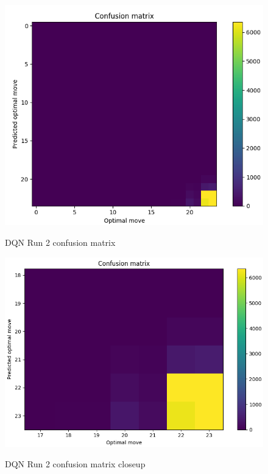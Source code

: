\begin{figure}
\caption{DQN Run 2 confusion matrix}
\centering
\includegraphics[scale=0.5]{cm3.png}\\
\end{figure}

\begin{figure}
\caption{DQN Run 2 confusion matrix closeup}
\centering
\includegraphics[scale=0.5]{cm4.png}\\
\end{figure}

